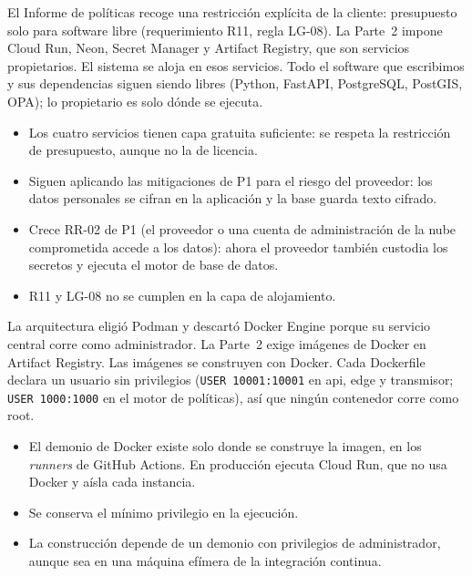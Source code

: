 \documentclass[11pt,a4paper]{article}
\theoremstyle{definition}
\theoremstyle{remark}
\newcommand{\code}[1]{\texttt{#1}}
\begin{document}
\adrctx El Informe de políticas recoge una restricción explícita de la cliente:
presupuesto solo para software libre (requerimiento R11, regla LG-08). La
Parte~2 impone Cloud Run, Neon, Secret Manager y Artifact Registry, que son
servicios propietarios.
\adrdec El sistema se aloja en esos servicios. Todo el software que escribimos y
sus dependencias siguen siendo libres (Python, FastAPI, PostgreSQL, PostGIS,
OPA); lo propietario es solo dónde se ejecuta.
\adrpos
\begin{itemize}
  \item Los cuatro servicios tienen capa gratuita suficiente: se respeta la
    restricción de presupuesto, aunque no la de licencia.
  \item Siguen aplicando las mitigaciones de P1 para el riesgo del proveedor:
    los datos personales se cifran en la aplicación y la base guarda texto
    cifrado.
\end{itemize}
\adrneg
\begin{itemize}
  \item Crece RR-02 de P1 (el proveedor o una cuenta de administración de la
    nube comprometida accede a los datos): ahora el proveedor también custodia
    los secretos y ejecuta el motor de base de datos.
  \item R11 y LG-08 no se cumplen en la capa de alojamiento.
\end{itemize}

\adrctx La arquitectura eligió Podman y descartó Docker Engine porque su
servicio central corre como administrador. La Parte~2 exige imágenes de
Docker en Artifact Registry.
\adrdec Las imágenes se construyen con Docker. Cada Dockerfile declara un
usuario sin privilegios (\code{USER 10001:10001} en api, edge y transmisor;
\code{USER 1000:1000} en el motor de políticas), así que ningún contenedor
corre como root.
\adrpos
\begin{itemize}
  \item El demonio de Docker existe solo donde se construye la imagen, en los
    \emph{runners} de GitHub Actions. En producción ejecuta Cloud Run, que no
    usa Docker y aísla cada instancia.
  \item Se conserva el mínimo privilegio en la ejecución.
\end{itemize}
\adrneg
\begin{itemize}
  \item La construcción depende de un demonio con privilegios de
    administrador, aunque sea en una máquina efímera de la integración
    continua.
\end{itemize}
\end{document}
